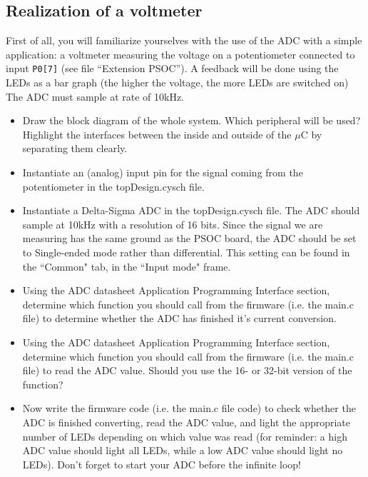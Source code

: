 \documentclass[11pt,a4paper]{article}
\theoremstyle{definition}%
\begin{document}
\subsection{Realization of a voltmeter}
First of all, you will familiarize yourselves with the use of the ADC with a simple application: a voltmeter measuring the voltage on a potentiometer connected to input \texttt{P0[7]} (see file ``Extension PSOC'').
A feedback will be done using the LEDs as a bar graph (the higher the voltage, the more LEDs are switched on)
The ADC must sample at rate of 10kHz.
\begin{itemize}
	\item Draw the block diagram of the whole system.
	Which peripheral will be used?
    Highlight the interfaces between the inside and outside of the $\mu$C by separating them clearly.
	\item Instantiate an (analog) input pin for the signal coming from the potentiometer in the topDesign.cysch file.
	\item Instantiate a Delta-Sigma ADC in the topDesign.cysch file. The ADC should sample at 10kHz with a resolution of 16 bits. Since the signal we are measuring has the same ground as the PSOC board, the ADC should be set to Single-ended mode rather than differential.
	This setting can be found in the ``Common" tab, in the ``Input mode" frame.
	\item Using the ADC datasheet Application Programming Interface section, determine which function you should call from the firmware (i.e. the main.c file) to determine whether the ADC has finished it's current conversion. 
	\item Using the ADC datasheet Application Programming Interface section, determine which function you should call from the firmware (i.e. the main.c file) to read the ADC value. Should you use the 16- or 32-bit version of the function? 
	\item Now write the firmware code (i.e. the main.c file code) to check whether the ADC is finished converting, read the ADC value, and light the appropriate number of LEDs depending on which value was read (for reminder: a high ADC value should light all LEDs, while a low ADC value should light no LEDs). Don't forget to start your ADC before the infinite loop! 
\end{itemize}
\end{document}
